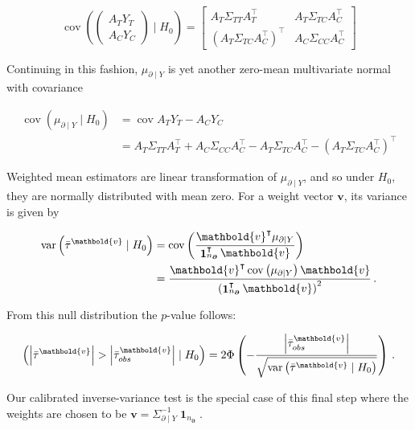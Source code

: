\documentclass[letter]{article}
\newcommand{\genericdel}[3]{%
      \left#1#3\right#2
    }
\newcommand{\del}[1]{\genericdel(){#1}}
\let\Pr\relax
\DeclareMathOperator{\Pr}{\mathbb{P}}
\DeclareMathOperator{\cov}{{cov}}
\DeclareMathOperator{\var}{{var}}
\newcommand{\abs}[1]{\genericdel||{#1}}
\DeclareMathOperator{\ones}{\mathbf{1}}
\newcommand{\trans}{^{\intercal}}
\newcommand{\vvec}{\mathbold{v}}
\newcommand{\boundary}{\partial}
\newcommand{\sentinels}{\bm{\boundary}}
\begin{document}
\begin{equation}
    \cov \del{\begin{pmatrix}A_T Y_T \\ A_C Y_C \end{pmatrix} \mid H_0 } = \begin{bmatrix}
                        A_T \Sigma_{TT} A_T\trans & A_T \Sigma_{TC} A_C\trans \\
                        \del{A_T \Sigma_{TC} A_C \trans}\trans & A_C \Sigma_{CC} A_C\trans
                    \end{bmatrix}
\end{equation}

Continuing in this fashion, \(\mu_{\boundary \mid Y}\) is yet another
zero-mean multivariate normal with covariance
    


    	\begin{equation}
\begin{split}
    \cov \del{\mu_{\boundary \mid Y} \mid H_0} &= \cov{ A_T Y_T - A_C Y_C } \\
        &= A_T \Sigma_{TT} A_T\trans + A_C \Sigma_{CC} A_C\trans - A_T \Sigma_{TC} A_C\trans -  \del{A_T\Sigma_{TC} A_C\trans}\trans
\end{split}
\end{equation}
    


    	Weighted mean estimators are linear transformation of
\(\mu_{\boundary \mid Y}\), and so under \(H_0\), they are normally
distributed with mean zero. For a weight vector \(\vvec\), its variance
is given by

\begin{equation}
\begin{aligned}
    \var\del{\bar{\tau}^\vvec \mid H_0} &= \cov\del{ \frac{\vvec \trans \mu_{\boundary \mid Y}}{\ones_{n_{\sentinels}}\trans \vvec}} \\
    &= \frac{\vvec \trans \cov \del{\mu_{\boundary \mid Y}} \vvec}{\del{\ones_{n_{\sentinels}}\trans \vvec}^2}
    \,.
\end{aligned}
\end{equation}
    


    	From this null distribution the \(p\)-value follows:

\begin{equation}
    \Pr\del{ \abs{\bar{\tau}^\vvec} > \abs{\bar{\tau}_{obs}^\vvec} \mid H_0} = 2 \Phi\del{ -\frac{\abs{\bar{\tau}_{obs}^\vvec}}{\sqrt{\var\del{\bar{\tau}^\vvec \mid H_0}}} }\,.
\end{equation}

Our calibrated inverse-variance test is the special case of this final
step where the weights are chosen to be
\(\vvec = \Sigma^{-1}_{\boundary \mid Y} \ones_{n_{\sentinels}}\).
    



    
    
    
    
\end{document}
